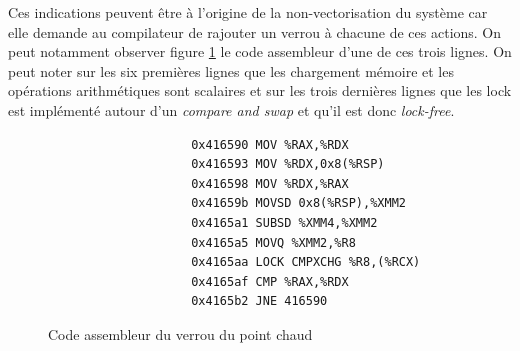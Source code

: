 \documentclass[11pt,a4paper]{article}
\begin{document}
			Ces indications peuvent être à l'origine de la non-vectorisation du système car elle demande au compilateur de rajouter un verrou à chacune de ces actions. On peut notamment observer figure \ref{code:hotspot_lock} le code assembleur d'une de ces trois lignes. On peut noter sur les six premières lignes que les chargement mémoire et les opérations arithmétiques sont scalaires et sur les trois dernières lignes que les lock est implémenté autour d'un \textit{compare and swap} et qu'il est donc \textit{lock-free}.

			\begin{figure}[h!]
				\caption{Code assembleur du verrou du point chaud}
				\label{code:hotspot_lock}
				\begin{verbatim}
					0x416590 MOV %RAX,%RDX
					0x416593 MOV %RDX,0x8(%RSP)
					0x416598 MOV %RDX,%RAX
					0x41659b MOVSD 0x8(%RSP),%XMM2
					0x4165a1 SUBSD %XMM4,%XMM2
					0x4165a5 MOVQ %XMM2,%R8
					0x4165aa LOCK CMPXCHG %R8,(%RCX)
					0x4165af CMP %RAX,%RDX
					0x4165b2 JNE 416590
				\end{verbatim}
			\end{figure}
\end{document}
